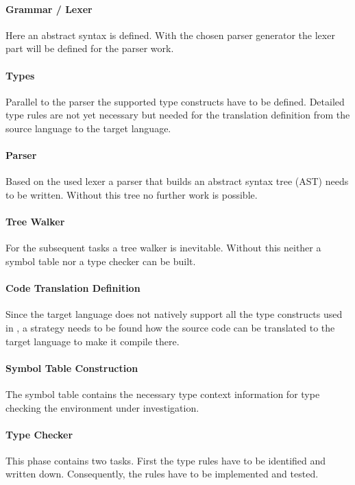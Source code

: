 \paragraph{Grammar / Lexer}
Here an abstract syntax is defined. With the chosen parser generator
the lexer part will be defined for the parser work.

\paragraph{Types}
Parallel to the parser the supported type constructs have to be
defined. Detailed type rules are not yet necessary but needed for the
translation definition from the source language to the target language.

\paragraph{Parser}
Based on the used lexer a parser that builds an abstract syntax tree
(AST) needs to be written. Without this tree no further work is possible.

\paragraph{Tree Walker}
For the subsequent tasks a tree walker is inevitable. Without this
neither a symbol table nor a type checker can be built.

\paragraph{Code Translation Definition}
Since the target language does not natively support all the type
constructs used in \ooplss, a strategy needs to be found
how the source code can be translated to the target language to make it
compile there.

\paragraph{Symbol Table Construction}
The symbol table contains the necessary type context information for
type checking the environment under investigation.

\paragraph{Type Checker}
This phase contains two tasks. First the type rules have to be identified
and written down. Consequently, the rules have to be implemented and tested.

